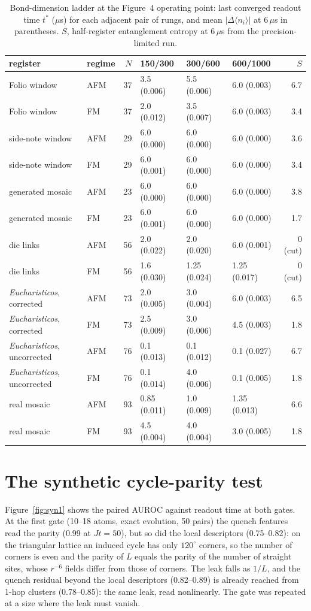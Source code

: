 \documentclass[11pt,a4paper]{article}
\begin{document}
\begin{table}[h]
\centering\small
\caption{Bond-dimension ladder at the Figure~4 operating point: last converged readout time $t^*$ ($\mu$s) for each adjacent pair of rungs, and mean $|\Delta\langle n_i\rangle|$ at 6\,$\mu$s in parentheses. $S$, half-register entanglement entropy at 6\,$\mu$s from the precision-limited run.}
\label{tab:e1}
\begin{tabular}{llrlllr}
\hline
register & regime & $N$ & 150/300 & 300/600 & 600/1000 & $S$ \\
\hline
Folio window & AFM & 37 & 3.5 (0.006) & 5.5 (0.006) & 6.0 (0.003) & 6.7 \\
Folio window & FM & 37 & 2.0 (0.012) & 3.5 (0.007) & 6.0 (0.003) & 3.4 \\
side-note window & AFM & 29 & 6.0 (0.000) & 6.0 (0.000) & 6.0 (0.000) & 3.6 \\
side-note window & FM & 29 & 6.0 (0.001) & 6.0 (0.000) & 6.0 (0.000) & 3.4 \\
generated mosaic & AFM & 23 & 6.0 (0.000) & 6.0 (0.000) & 6.0 (0.000) & 3.8 \\
generated mosaic & FM & 23 & 6.0 (0.001) & 6.0 (0.000) & 6.0 (0.000) & 1.7 \\
die links & AFM & 56 & 2.0 (0.022) & 2.0 (0.020) & 6.0 (0.001) & 0 (cut) \\
die links & FM & 56 & 1.6 (0.030) & 1.25 (0.024) & 1.25 (0.017) & 0 (cut) \\
\emph{Eucharisticos}, corrected & AFM & 73 & 2.0 (0.005) & 3.0 (0.004) & 6.0 (0.003) & 6.5 \\
\emph{Eucharisticos}, corrected & FM & 73 & 2.5 (0.009) & 3.0 (0.006) & 4.5 (0.003) & 1.8 \\
\emph{Eucharisticos}, uncorrected & AFM & 76 & 0.1 (0.013) & 0.1 (0.012) & 0.1 (0.027) & 6.7 \\
\emph{Eucharisticos}, uncorrected & FM & 76 & 0.1 (0.014) & 4.0 (0.006) & 0.1 (0.005) & 1.8 \\
real mosaic & AFM & 93 & 0.85 (0.011) & 1.0 (0.009) & 1.35 (0.013) & 6.6 \\
real mosaic & FM & 93 & 4.5 (0.004) & 4.0 (0.004) & 3.0 (0.005) & 1.8 \\
\hline
\end{tabular}
\end{table}

\section{The synthetic cycle-parity test}
Figure~\ref{fig:syn1} shows the paired AUROC against readout time at both gates. At the first gate (10--18 atoms, exact evolution, 50 pairs) the quench features read the parity (0.99 at $Jt=50$), but so did the local descriptors (0.75--0.82): on the triangular lattice an induced cycle has only $120^\circ$ corners, so the number of corners is even and the parity of $L$ equals the parity of the number of straight sites, whose $r^{-6}$ fields differ from those of corners. The leak falls as $1/L$, and the quench residual beyond the local descriptors (0.82--0.89) is already reached from 1-hop clusters (0.78--0.85): the same leak, read nonlinearly. The gate was repeated at a size where the leak must vanish.
\end{document}
